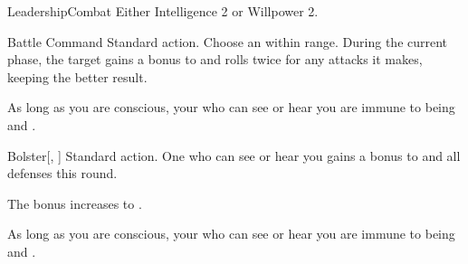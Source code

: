     \begin{feat}{Leadership}{Combat}
        \featpre Either Intelligence 2 or Willpower 2.

        \begin{activeability}{Battle Command}
            \abilityusagetime Standard action.
            \rankline
            Choose an  within \rngmed range.
            During the current phase, the target gains a  bonus to  and rolls twice for any attacks it makes, keeping the better result.
        \end{activeability}

         As long as you are conscious, your  who can see or hear you are immune to being \frightened and \panicked.

        \begin{activeability}{Bolster}[, ]
            \abilityusagetime Standard action.
            \rankline
            One  who can see or hear you gains a  bonus to  and all defenses this round.

            \rankline
             The bonus increases to .
        \end{activeability}

         As long as you are conscious, your  who can see or hear you are immune to being \stunned and \confused.
    \end{feat}

